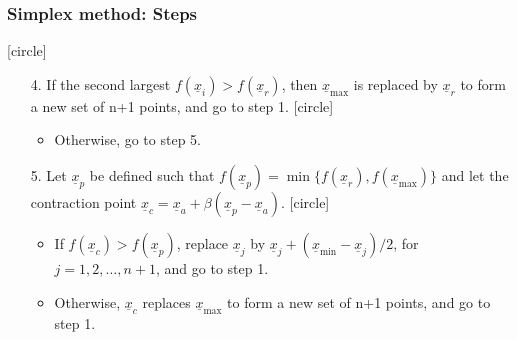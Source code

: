 \documentclass{beamer}
\begin{document}
\begin{frame}
    \frametitle{Simplex method: Steps}
    [circle]
    \begin{enumerate}
        \item[4.]If the second largest $f(\underline{x}_i)>f(\underline{x}_{r})$,
         then $\underline{x}_{\max}$ is replaced by $\underline{x}_r$ to form a new set of n+1 points,
         and go to step 1.
         [circle]
         \begin{itemize}
             \item Otherwise, go to step 5.
         \end{itemize}
        \item[5.] Let $\underline{x}_p$ be defined such that $f(\underline{x}_p)=\min{\{f(\underline{x}_r), f(\underline{x}_{\max})\}}$
        and let the contraction point $\underline{x}_c=\underline{x}_a+\beta (\underline{x}_p-\underline{x}_a)$.
        [circle]
        \begin{itemize}
            \item If $f(\underline{x}_c)>f(\underline{x}_p)$, replace $\underline{x}_j$ by $\underline{x}_j+(\underline{x}_{\min}-\underline{x}_j)/2$, for $j=1,2,\dots,n+1$, and go to step 1.
            \item Otherwise, $\underline{x}_c$ replaces $\underline{x}_{\max}$ to form a new set of n+1 points, and go to step 1.
        \end{itemize}
    \end{enumerate}
    
\end{frame}
\end{document}
